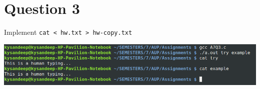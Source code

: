 \documentclass[main.tex]{subfiles}
\begin{document}
\section{Question 3}
Implement \texttt{cat < hw.txt > hw-copy.txt}


\includegraphics[width=\textwidth]{figures/3_output.png}
\end{document}
